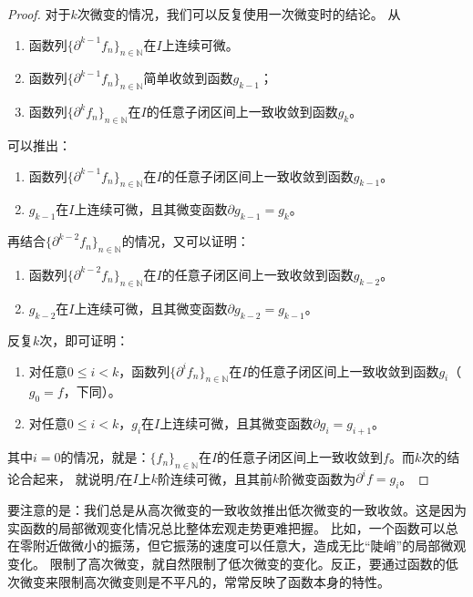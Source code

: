 \documentclass[12pt,UTF8,fontset=none]{ctexbook}
\begin{document}
\begin{appendix}
\begin{proof}
    对于$k$次微变的情况，我们可以反复使用一次微变时的结论。
    从
    \begin{enumerate}
        \item 函数列$\{\partial^{k-1} f_n\}_{n\in\mathbb{N}}$在$I$上连续可微。
        \item 函数列$\{\partial^{k-1} f_n\}_{n\in\mathbb{N}}$简单收敛到函数$g_{k-1}$；
        \item 函数列$\{\partial^k f_n\}_{n\in\mathbb{N}}$在$I$的任意子闭区间上一致收敛到函数$g_k$。
    \end{enumerate}
    可以推出：
    \begin{enumerate}
        \item 函数列$\{\partial^{k-1} f_n\}_{n\in\mathbb{N}}$在$I$的任意子闭区间上一致收敛到函数$g_{k-1}$。
        \item $g_{k-1}$在$I$上连续可微，且其微变函数$\partial g_{k-1} = g_k$。
    \end{enumerate}
    再结合$\{\partial^{k-2} f_n\}_{n\in\mathbb{N}}$的情况，又可以证明：
    \begin{enumerate}
        \item 函数列$\{\partial^{k-2} f_n\}_{n\in\mathbb{N}}$在$I$的任意子闭区间上一致收敛到函数$g_{k-2}$。
        \item $g_{k-2}$在$I$上连续可微，且其微变函数$\partial g_{k-2} = g_{k-1}$。
    \end{enumerate}
    反复$k$次，即可证明：
    \begin{enumerate}
        \item 对任意$0\leqslant i < k$，函数列$\{\partial^{i} f_n\}_{n\in\mathbb{N}}$在$I$的任意子闭区间上一致收敛到函数$g_{i}$（$g_0 = f$，下同）。
        \item 对任意$0\leqslant i < k$，$g_{i}$在$I$上连续可微，且其微变函数$\partial g_{i} = g_{i+1}$。
    \end{enumerate}
    其中$i = 0$的情况，就是：$\{f_n\}_{n\in\mathbb{N}}$在$I$的任意子闭区间上一致收敛到$f$。而$k$次的结论合起来，
    就说明$f$在$I$上$k$阶连续可微，且其前$k$阶微变函数为$\partial^i f = g_i$。

\end{proof}

要注意的是：我们总是从高次微变的一致收敛推出低次微变的一致收敛。这是因为实函数的局部微观变化情况总比整体宏观走势更难把握。
比如，一个函数可以总在零附近做微小的振荡，但它振荡的速度可以任意大，造成无比“陡峭”的局部微观变化。
限制了高次微变，就自然限制了低次微变的变化。反正，要通过函数的低次微变来限制高次微变则是不平凡的，常常反映了函数本身的特性。


\end{appendix}
\end{document}
